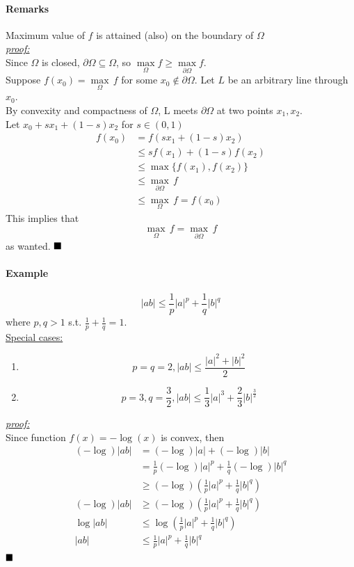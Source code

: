 \documentclass[11pt]{article}
\newcommand{\under}[1]{\underline{#1}}
\newcommand{\proof}[0]{\textit{\underline{proof:} }}
\newcommand{\qed}[0]{$\hfill\blacksquare$}
\begin{document}
\paragraph{Remarks}
Maximum value of $f$ is attained (also) on the boundary of $\Omega$ \\
\proof \\
Since $\Omega$ is closed, $\partial \Omega \subseteq \Omega$, so $\underset{\Omega}{\max} f \geq \underset{\partial \Omega}{\max} f$.\\
Suppose $f(x_0) = \underset{\Omega}{\max} \, f$ for some $x_0 \notin \partial \Omega$.
Let $L$ be an arbitrary line through $x_0$. \\
By convexity and compactness of $\Omega$, L meets $\partial \Omega$ at two points $x_1, x_2$. 
\\
Let $x_0 + sx_1 + (1-s)x_2$ for $ s\in (0,1)$
\begin{align*}
	f(x_0) &= f(sx_1 + (1-s)x_2) \\
	&\leq sf(x_1) + (1-s)f(x_2) \tag{$f$ convex}\\
	&\leq \max\{f(x_1), f(x_2)\} \\
	&\leq \underset{\partial \Omega}{\max} \, f\\
	&\leq \underset{\Omega}{\max} \, f = f(x_0) 
\end{align*}
This implies that $$\underset{\Omega}{\max} \, f = \underset{\partial \Omega}{\max} \, f$$
as wanted.
\qed

\paragraph{Example}
$$|ab| \leq \frac{1}{p}|a|^p + \frac{1}{q}|b|^q$$
where $p,q > 1$ s.t. $\frac{1}{p} + \frac{1}{q} = 1$.\\
\under{Special cases:}
\begin{enumerate}
	\item $$p=q=2, |ab| \leq \frac{|a|^2 + |b|^2}{2}$$ 
	\item 
	$$p=3, q=\frac{3}{2}, |ab| \leq \frac{1}{3}|a|^3 + \frac{2}{3}|b|^{\frac{3}{2}}$$
\end{enumerate}
\proof \\
Since function $f(x) = -\log (x)$ is convex, then
\begin{align*}
	(-\log)|ab| &= (-\log)|a| + (-\log)|b| \\
	&= \frac{1}{p}(-\log)|a|^p + \frac{1}{q}(-\log)|b|^q \\
	&\geq (-\log)(\frac{1}{p}|a|^p + \frac{1}{q}|b|^q)\\
	(-\log)|ab| &\geq (-\log)(\frac{1}{p}|a|^p + \frac{1}{q}|b|^q) \\
	\log|ab| &\leq \log(\frac{1}{p}|a|^p + \frac{1}{q}|b|^q) \\
	|ab| &\leq \frac{1}{p}|a|^p + \frac{1}{q}|b|^q \tag{exponential function is increasing}
\end{align*}
\qed 
\end{document}
